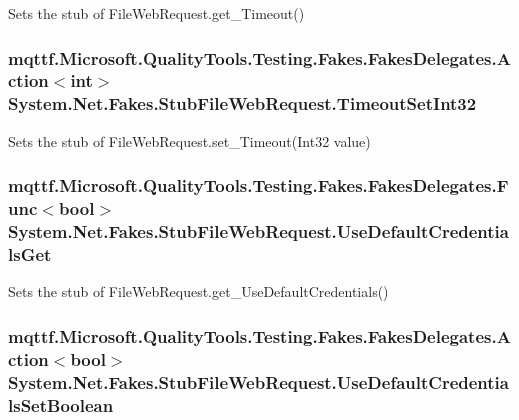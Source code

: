 Sets the stub of File\-Web\-Request.\-get\-\_\-\-Timeout()

\hypertarget{class_system_1_1_net_1_1_fakes_1_1_stub_file_web_request_a8668dfc2ed5235b3bca9da528c67d72d}{
\subsubsection[{Timeout\-Set\-Int32}]{\setlength{\rightskip}{0pt plus 5cm}mqttf.\-Microsoft.\-Quality\-Tools.\-Testing.\-Fakes.\-Fakes\-Delegates.\-Action$<$int$>$ System.\-Net.\-Fakes.\-Stub\-File\-Web\-Request.\-Timeout\-Set\-Int32}}\label{class_system_1_1_net_1_1_fakes_1_1_stub_file_web_request_a8668dfc2ed5235b3bca9da528c67d72d}


Sets the stub of File\-Web\-Request.\-set\-\_\-\-Timeout(\-Int32 value)

\hypertarget{class_system_1_1_net_1_1_fakes_1_1_stub_file_web_request_aae07f17b2122f892a6f938fff4f52ad5}{
\subsubsection[{Use\-Default\-Credentials\-Get}]{\setlength{\rightskip}{0pt plus 5cm}mqttf.\-Microsoft.\-Quality\-Tools.\-Testing.\-Fakes.\-Fakes\-Delegates.\-Func$<$bool$>$ System.\-Net.\-Fakes.\-Stub\-File\-Web\-Request.\-Use\-Default\-Credentials\-Get}}\label{class_system_1_1_net_1_1_fakes_1_1_stub_file_web_request_aae07f17b2122f892a6f938fff4f52ad5}


Sets the stub of File\-Web\-Request.\-get\-\_\-\-Use\-Default\-Credentials()

\hypertarget{class_system_1_1_net_1_1_fakes_1_1_stub_file_web_request_a3bbe240829797918a6d03f1166b07419}{
\subsubsection[{Use\-Default\-Credentials\-Set\-Boolean}]{\setlength{\rightskip}{0pt plus 5cm}mqttf.\-Microsoft.\-Quality\-Tools.\-Testing.\-Fakes.\-Fakes\-Delegates.\-Action$<$bool$>$ System.\-Net.\-Fakes.\-Stub\-File\-Web\-Request.\-Use\-Default\-Credentials\-Set\-Boolean}}\label{class_system_1_1_net_1_1_fakes_1_1_stub_file_web_request_a3bbe240829797918a6d03f1166b07419}


